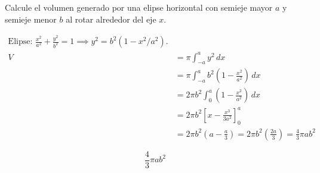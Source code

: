 Calcule el volumen generado por una elipse horizontal con semieje mayor $a$ y semieje menor $b$ al rotar alrededor del eje $x$.

\nopagebreak
\begin{align*}
\text{Elipse: } \frac{x^2}{a^2} + \frac{y^2}{b^2} = 1 \implies y^2 = b^2(1 - x^2/a^2). \\
V &= \pi \int_{-a}^{a} y^2 \, dx \\
&= \pi \int_{-a}^{a} b^2 \left(1 - \frac{x^2}{a^2}\right) \, dx \\
&= 2\pi b^2 \int_{0}^{a} \left(1 - \frac{x^2}{a^2}\right) \, dx \\
&= 2\pi b^2 \left[ x - \frac{x^3}{3a^2} \right]_{0}^{a} \\
&= 2\pi b^2 \left( a - \frac{a}{3} \right) = 2\pi b^2 \left(\frac{2a}{3}\right) = \frac{4}{3}\pi ab^2
\end{align*}

\[
\boxed{\displaystyle \frac{4}{3}\pi ab^2}
\]
